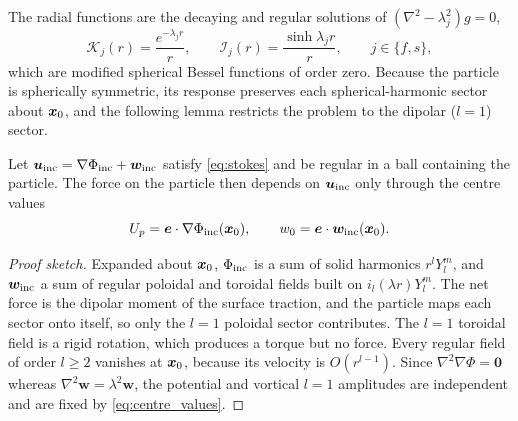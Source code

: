 The radial functions are the decaying and regular solutions of $(\nabla^2-\lambda_j^2)g=0$,
\begin{equation*}
  \mathcal K_j(r)=\frac{e^{-\lambda_j r}}{r},\qquad \mathcal I_j(r)=\frac{\sinh\lambda_j r}{r},\qquad j\in\{f,s\},
\end{equation*}
which are modified spherical Bessel functions of order zero. Because the particle is spherically symmetric, its response
preserves each spherical-harmonic sector about $\bm{x}_0$, and the following lemma restricts the problem to the dipolar
($l=1$) sector.

\begin{lemma}\label{lem:faxen}
Let $\bm{u}_{\rm inc}=\nabla\Phi_{\rm inc}+\bm w_{\rm inc}$ satisfy \cref{eq:stokes} and be regular in a ball containing the
particle. The force on the particle then depends on $\bm{u}_{\rm inc}$ only through the centre values
\begin{equation}
  U_p=\bm{e}\cdot\nabla\Phi_{\rm inc}(\bm{x}_0),\qquad w_0=\bm{e}\cdot\bm w_{\rm inc}(\bm{x}_0).
  \label{eq:centre_values}
\end{equation}
\end{lemma}
\begin{proof}[Proof sketch]
Expanded about $\bm{x}_0$, $\Phi_{\rm inc}$ is a sum of solid harmonics $r^lY_l^m$, and $\bm w_{\rm inc}$ a sum of regular
poloidal and toroidal fields built on $i_l(\lambda r)Y_l^m$. The net force is the dipolar moment of the surface
traction, and the particle maps each sector onto itself, so only the $l=1$ poloidal sector contributes. The $l=1$
toroidal field is a rigid rotation, which produces a torque but no force. Every regular field of order $l\ge2$ vanishes
at $\bm{x}_0$, because its velocity is $O(r^{l-1})$. Since $\nabla^2\nabla\Phi=\bm 0$ whereas
$\nabla^2\bm w=\lambda^2\bm w$, the potential and vortical $l=1$ amplitudes are independent and are fixed by
\cref{eq:centre_values}.
\end{proof}

